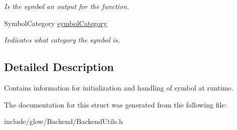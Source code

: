 \begin{DoxyCompactItemize}
\begin{DoxyCompactList}\small\item\em Is the symbol an output for the function. \end{DoxyCompactList}\item 
\mbox{\label{structglow_1_1runtime_1_1_runtime_symbol_info_adcc00d026a3ad8b85bb8937b7001200b}} 
Symbol\+Category \hyperlink{structglow_1_1runtime_1_1_runtime_symbol_info_adcc00d026a3ad8b85bb8937b7001200b}{symbol\+Category}
\begin{DoxyCompactList}\small\item\em Indicates what category the symbol is. \end{DoxyCompactList}\end{DoxyCompactItemize}


\subsection{Detailed Description}
Contains information for initialization and handling of symbol at runtime. 

The documentation for this struct was generated from the following file\+:\begin{DoxyCompactItemize}
\item 
include/glow/\+Backend/Backend\+Utils.\+h\end{DoxyCompactItemize}
